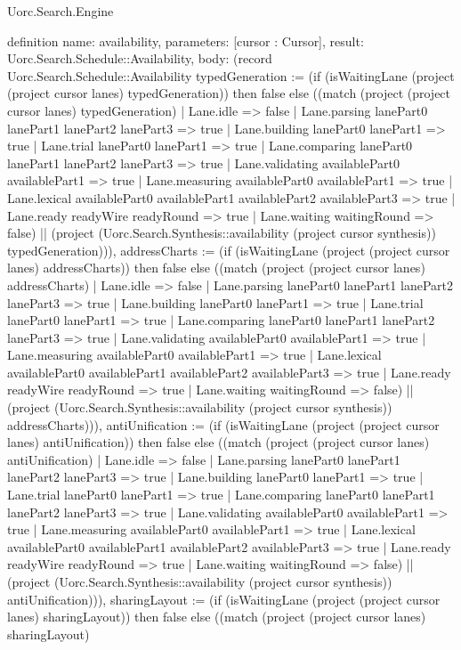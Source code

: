 \begin{lexlean}{Uorc.Search.Engine}
\begin{semanticmodule}
definition{
  name: availability,
  parameters: [cursor : Cursor],
  result: Uorc.Search.Schedule::Availability,
  body: (record Uorc.Search.Schedule::Availability {typedGeneration := (if (isWaitingLane (project (project cursor lanes) typedGeneration)) then false else ((match (project (project cursor lanes) typedGeneration)
    | Lane.idle => false
    | Lane.parsing lanePart0 lanePart1 lanePart2 lanePart3 => true
    | Lane.building lanePart0 lanePart1 => true
    | Lane.trial lanePart0 lanePart1 => true
    | Lane.comparing lanePart0 lanePart1 lanePart2 lanePart3 => true
    | Lane.validating availablePart0 availablePart1 => true
    | Lane.measuring availablePart0 availablePart1 => true
    | Lane.lexical availablePart0 availablePart1 availablePart2 availablePart3 => true
    | Lane.ready readyWire readyRound => true
    | Lane.waiting waitingRound => false) || (project (Uorc.Search.Synthesis::availability (project cursor synthesis)) typedGeneration))), addressCharts := (if (isWaitingLane (project (project cursor lanes) addressCharts)) then false else ((match (project (project cursor lanes) addressCharts)
    | Lane.idle => false
    | Lane.parsing lanePart0 lanePart1 lanePart2 lanePart3 => true
    | Lane.building lanePart0 lanePart1 => true
    | Lane.trial lanePart0 lanePart1 => true
    | Lane.comparing lanePart0 lanePart1 lanePart2 lanePart3 => true
    | Lane.validating availablePart0 availablePart1 => true
    | Lane.measuring availablePart0 availablePart1 => true
    | Lane.lexical availablePart0 availablePart1 availablePart2 availablePart3 => true
    | Lane.ready readyWire readyRound => true
    | Lane.waiting waitingRound => false) || (project (Uorc.Search.Synthesis::availability (project cursor synthesis)) addressCharts))), antiUnification := (if (isWaitingLane (project (project cursor lanes) antiUnification)) then false else ((match (project (project cursor lanes) antiUnification)
    | Lane.idle => false
    | Lane.parsing lanePart0 lanePart1 lanePart2 lanePart3 => true
    | Lane.building lanePart0 lanePart1 => true
    | Lane.trial lanePart0 lanePart1 => true
    | Lane.comparing lanePart0 lanePart1 lanePart2 lanePart3 => true
    | Lane.validating availablePart0 availablePart1 => true
    | Lane.measuring availablePart0 availablePart1 => true
    | Lane.lexical availablePart0 availablePart1 availablePart2 availablePart3 => true
    | Lane.ready readyWire readyRound => true
    | Lane.waiting waitingRound => false) || (project (Uorc.Search.Synthesis::availability (project cursor synthesis)) antiUnification))), sharingLayout := (if (isWaitingLane (project (project cursor lanes) sharingLayout)) then false else ((match (project (project cursor lanes) sharingLayout)
}}
\end{semanticmodule}
\end{lexlean}
